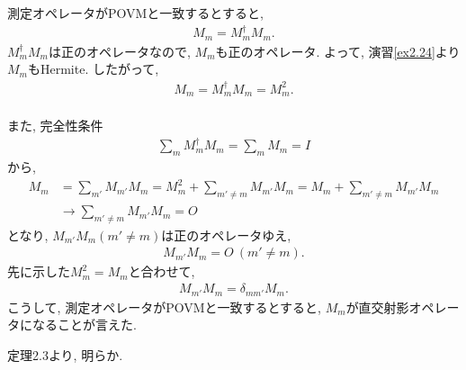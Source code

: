 \begin{ex}
    \label{ex2.62}
    測定オペレータがPOVMと一致するとすると,
    \begin{align*}
        M_m = M_m^\dagger M_m .
    \end{align*}
    $M_m^\dagger M_m$は正のオペレータなので, $M_m$も正のオペレータ.
    よって, 演習\ref{ex2.24}より$M_m$もHermite. したがって,
    \begin{align*}
        M_m = M_m^\dagger M_m = M_m^2.
    \end{align*}
    \\
    また, 完全性条件
    \begin{align*}
        \sum_m M^\dagger_m M_m =  \sum_m M_m = I
    \end{align*}
    から,
    \begin{align*}
        M_m
         & = \sum_{m'} M_{m'} M_m
        = M_m^2 + \sum_{m'\neq m} M_{m'} M_m
        = M_m + \sum_{m'\neq m} M_{m'} M_m
        \\
         & \to  \sum_{m'\neq m} M_{m'} M_m = O
    \end{align*}
    となり, $M_{m'} M_m (m'\neq m)$は正のオペレータゆえ,
    \begin{align*}
        M_{m'} M_m  = O \ (m'\neq m).
    \end{align*}
    先に示した$M_m^2 = M_m$と合わせて,
    \begin{align*}
        M_{m'} M_m  = \delta_{m m'} M_m.
    \end{align*}
    こうして, 測定オペレータがPOVMと一致するとすると, $M_m$が直交射影オペレータになることが言えた.
\end{ex}

\begin{ex}
    \label{ex2.63}
    定理2.3より, 明らか.
\end{ex}

